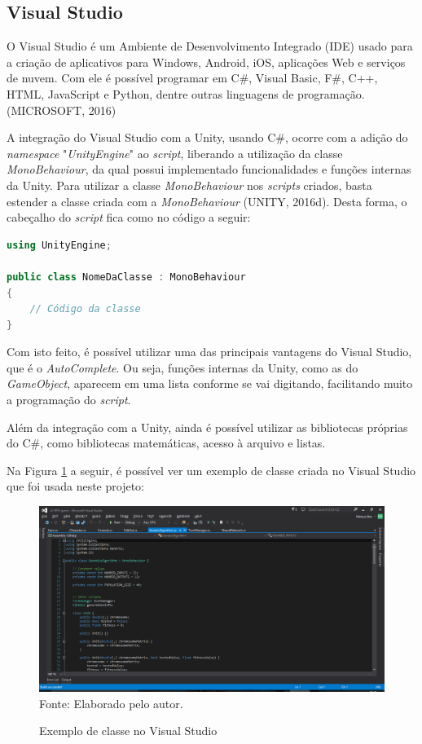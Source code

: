 \documentclass[12pt,a4paper]{article}
\newcommand{\source}[1]{\small Fonte: {#1}}
\begin{document}
	\FloatBarrier
	\subsection{Visual Studio}
		O Visual Studio é um Ambiente de Desenvolvimento Integrado (IDE) usado para a criação de aplicativos para Windows, Android, iOS, aplicações Web e serviços de nuvem.
		Com ele é possível programar em C\#, Visual Basic, F\#, C++, HTML, JavaScript e Python, dentre outras linguagens de programação. (MICROSOFT, 2016)
		
		A integração do Visual Studio com a Unity, usando C\#, ocorre com a adição do \textit{namespace} "\textit{UnityEngine}"{} ao \textit{script},
		liberando a utilização da classe \textit{MonoBehaviour},
		da qual possui implementado funcionalidades e funções internas da Unity.
		Para utilizar a classe \textit{MonoBehaviour} nos \textit{scripts} criados,
		basta estender a classe criada com a \textit{MonoBehaviour} (UNITY, 2016d).
		Desta forma, o cabeçalho do \textit{script} fica como no código a seguir:
		
		\begin{lstlisting}[language=C++]
using UnityEngine;

public class NomeDaClasse : MonoBehaviour
{
	// Código da classe
}\end{lstlisting}
		
		Com isto feito, é possível utilizar uma das principais vantagens do Visual Studio,
		que é o \textit{AutoComplete}.
		Ou seja, funções internas da Unity, como as do \textit{GameObject}, aparecem em uma lista conforme se vai digitando,
		facilitando muito a programação do \textit{script}.
		
		Além da integração com a Unity,
		ainda é possível utilizar as bibliotecas próprias do C\#,
		como bibliotecas matemáticas, acesso à arquivo e listas.
		
		Na Figura \ref{fig:exvs} a seguir, é possível ver um exemplo de classe criada no Visual Studio que foi usada neste projeto:
		
		\begin{figure}[ht!]
			\caption{Exemplo de classe no Visual Studio}
			\centering
			\includegraphics[scale=0.4]{InterfaceVisualStudio.png}\\
			\vspace{0.5mm}
			\source{Elaborado pelo autor.}
			\label{fig:exvs}
		\end{figure}
		
\end{document}
